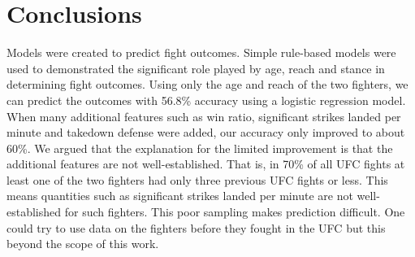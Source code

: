 \clearpage
\section{Conclusions}

Models were created to predict fight outcomes. Simple rule-based models
were used to demonstrated the significant role played by
age, reach and stance in determining fight outcomes.
Using only the age and reach of the two fighters, we can predict
the outcomes with
56.8\% accuracy using a logistic regression model. When many additional
features such as win ratio,
significant strikes landed per minute and takedown defense were
added, our accuracy only improved to about 60\%. We argued that the explanation
for the limited improvement is that the
additional features are not well-established. That is,
in 70\% of all UFC fights at least one of the two fighters
had only three previous UFC fights or less. This means quantities such
as significant strikes landed per minute are not well-established
for such fighters. This poor sampling makes prediction difficult. One could try
to use data on the fighters before they fought in the UFC
but this beyond the scope of this work.
